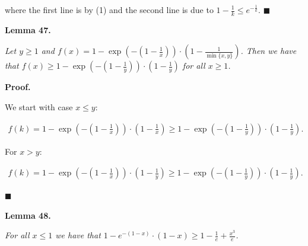 \documentclass[10pt,a4paper]{article}
\begin{document}
where the first line is by (1) and the second line is due to $1-\frac{1}{k}\leq e^{-\frac{1}{k}}$.
\ensuremath{\blacksquare}\par






\par\medskip\noindent\textbf{\textbf{Lemma 47}\textbf{.}}\par



\emph{Let $y\geq 1$ and $f(x)=1-\exp\left(-\left(1-\frac{1}{x}\right)\right)\cdot\left(1-\frac{1}{\min\{x,y\}}\right)$.
Then we have that
$f(x)\geq 1-\exp\left(-\left(1-\frac{1}{y}\right)\right)\cdot\left(1-\frac{1}{y}\right)$ for all $x\geq 1$.}\par






\par\medskip\noindent\textbf{Proof.}\par



We start with case $x\leq y$:\par


\[\begin{gathered}
\displaystyle f(k)=1-\exp\left(-\left(1-\frac{1}{x}\right)\right)\cdot\left(1-\frac{1}{x}\right)\geq 1-\exp\left(-\left(1-\frac{1}{y}\right)\right)\cdot\left(1-\frac{1}{y}\right).
\end{gathered}\]


For $x>y$:\par


\[\begin{gathered}
\displaystyle f(k)=1-\exp\left(-\left(1-\frac{1}{x}\right)\right)\cdot\left(1-\frac{1}{y}\right)\geq 1-\exp\left(-\left(1-\frac{1}{y}\right)\right)\cdot\left(1-\frac{1}{y}\right).
\end{gathered}\]


\ensuremath{\blacksquare}\par






\par\medskip\noindent\textbf{\textbf{Lemma 48}\textbf{.}}\par



\emph{For all $x\leq 1$ we have that $1-e^{-(1-x)}\cdot(1-x)\geq 1-\frac{1}{e}+\frac{x^{3}}{e}$.}\par
\end{document}
